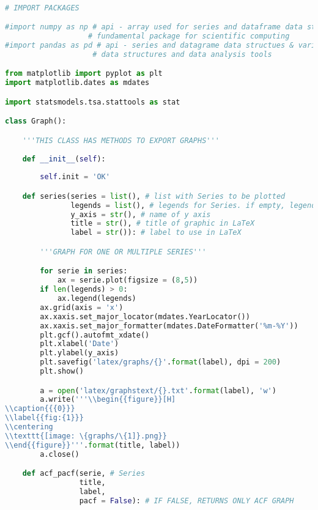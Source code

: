 \begin{lstlisting}[language=Python]

# IMPORT PACKAGES

#import numpy as np # api - array used for series and dataframe data structures
                   # fundamental package for scientific computing
#import pandas as pd # api - series and datagrame data structues & various 
                    # data structures and data analysis tools

from matplotlib import pyplot as plt
import matplotlib.dates as mdates

import statsmodels.tsa.stattools as stat

class Graph():

    '''THIS CLASS HAS METHODS TO EXPORT GRAPHS'''
    
    def __init__(self):
        
        self.init = 'OK'

    def series(series = list(), # list with Series to be plotted
               legends = list(), # legends for Series. if empty, legends are not included
               y_axis = str(), # name of y axis
               title = str(), # title of graphic in LaTeX
               label = str()): # label to use in LaTeX

        '''GRAPH FOR ONE OR MULTIPLE SERIES'''

        for serie in series:
            ax = serie.plot(figsize = (8,5))
        if len(legends) > 0:
            ax.legend(legends)
        ax.grid(axis = 'x')
        ax.xaxis.set_major_locator(mdates.YearLocator())
        ax.xaxis.set_major_formatter(mdates.DateFormatter('%m-%Y'))
        plt.gcf().autofmt_xdate()
        plt.xlabel('Date')
        plt.ylabel(y_axis)
        plt.savefig('latex/graphs/{}'.format(label), dpi = 200)
        plt.show()

        a = open('latex/graphstext/{}.txt'.format(label), 'w')
        a.write('''\\begin{{figure}}[H]
\\caption{{{0}}}
\\label{{fig:{1}}}
\\centering
\\texttt{[image: \{graphs/\{1]}.png}}
\\end{{figure}}'''.format(title, label))
        a.close()

    def acf_pacf(serie, # Series
                 title,
                 label, 
                 pacf = False): # IF FALSE, RETURNS ONLY ACF GRAPH


\end{lstlisting}
